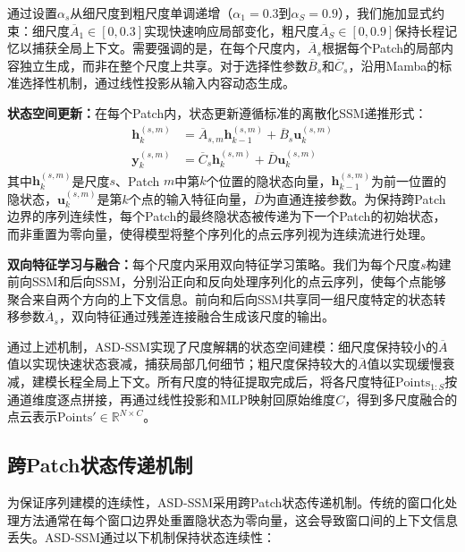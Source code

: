 \documentclass[12pt,a4paper,openany,oneside]{ctexbook}
\theoremstyle{definition}
\theoremstyle{remark}
\begin{document}
通过设置$\alpha_s$从细尺度到粗尺度单调递增（$\alpha_1 = 0.3$到$\alpha_S = 0.9$），我们施加显式约束：细尺度$\overline{A}_1 \in [0, 0.3]$实现快速响应局部变化，粗尺度$\overline{A}_S \in [0, 0.9]$保持长程记忆以捕获全局上下文。需要强调的是，在每个尺度内，$\overline{A}_s$根据每个Patch的局部内容独立生成，而非在整个尺度上共享。对于选择性参数$\overline{B}_s$和$\overline{C}_s$，沿用Mamba\cite{Mamba}的标准选择性机制，通过线性投影从输入内容动态生成。

\textbf{状态空间更新：}在每个Patch内，状态更新遵循标准的离散化SSM递推形式\cite{Mamba}：
\begin{equation}
	\begin{aligned}
		\mathbf{h}_k^{(s,m)} &= \overline{A}_{s,m} \mathbf{h}_{k-1}^{(s,m)} + \overline{B}_s \mathbf{u}_k^{(s,m)} \\
		\mathbf{y}_k^{(s,m)} &= \overline{C}_s \mathbf{h}_k^{(s,m)} + \overline{D} \mathbf{u}_k^{(s,m)}
	\end{aligned}
	\label{eq:asd_ssm_update}
\end{equation}
其中$\mathbf{h}_k^{(s,m)}$是尺度$s$、Patch $m$中第$k$个位置的隐状态向量，$\mathbf{h}_{k-1}^{(s,m)}$为前一位置的隐状态，$\mathbf{u}_k^{(s,m)}$是第$k$个点的输入特征向量，$\overline{D}$为直通连接参数。为保持跨Patch边界的序列连续性，每个Patch的最终隐状态被传递为下一个Patch的初始状态，而非重置为零向量，使得模型将整个序列化的点云序列视为连续流进行处理。

\textbf{双向特征学习与融合：}每个尺度内采用双向特征学习策略。我们为每个尺度$s$构建前向SSM和后向SSM，分别沿正向和反向处理序列化的点云序列，使每个点能够聚合来自两个方向的上下文信息。前向和后向SSM共享同一组尺度特定的状态转移参数$\overline{A}_s$，双向特征通过残差连接融合生成该尺度的输出。

通过上述机制，ASD-SSM实现了尺度解耦的状态空间建模：细尺度保持较小的$\overline{A}$值以实现快速状态衰减，捕获局部几何细节；粗尺度保持较大的$\overline{A}$值以实现缓慢衰减，建模长程全局上下文。所有尺度的特征提取完成后，将各尺度特征$\text{Points}_{1:S}$按通道维度逐点拼接，再通过线性投影和MLP映射回原始维度$C$，得到多尺度融合的点云表示$\text{Points}' \in \mathbb{R}^{N \times C}$。

\subsection{跨Patch状态传递机制}

为保证序列建模的连续性，ASD-SSM采用跨Patch状态传递机制。传统的窗口化处理方法通常在每个窗口边界处重置隐状态为零向量，这会导致窗口间的上下文信息丢失。ASD-SSM通过以下机制保持状态连续性：
\end{document}
